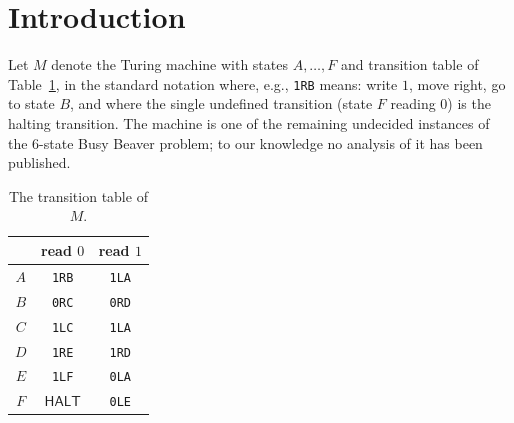 \documentclass[11pt]{amsart}
\theoremstyle{definition}
\DeclareMathOperator{\HALT}{\textsf{HALT}}
\begin{document}
\begin{abstract}
roots); a \emph{parity kill of dangerous keys} ($q\equiv1\bmod144\wedge q>1
\Rightarrow q\ge145\Rightarrow$ not a power; $19$ of the $20$ observed
classes permanently safe by key definition); and the \emph{drift law}
$\mathrm{M''}$ --- eight window families with the unified form
$A=3\cdot2^{k-1}w+2^{j}\mu$ at window positions
$13/26/50/99/110/194/219/220$, every family parity-killed, with the
$m\le40$ synthetic assertion table ($60$ segments, $0$ powers, $56/56$ exact
$F_{26}$ identities) --- which compresses the residual of Assumption~M into a
single arithmetic sentence in birth coordinates: the conditional chain of
the main theorem is thereby refined to ``never halts $\Leftarrow$
$\mathrm{M''}$ $+$ class preservation'', with the three precise gaps to an
unconditional proof (window-enumeration completeness $=$ M; conditionality of
class preservation; $m>25$ as a constructed-anchor property) stated
explicitly. Per-depth raw-reproduced witnesses (through depth $3$) show
that birth guards fail at every finite depth, stated at witnessed level. All
other components are proved
algebraically or verified exhaustively over declared finite domains;
every claim is classified in a ledger (algebraic / exhaustive /
assumption-dependent).
\end{abstract}

\section{Introduction}\label{s:intro}

Let $M$ denote the Turing machine with states $A,\dots,F$ and transition
table of Table~\ref{tab:tm}, in the standard notation where, e.g.,
\texttt{1RB} means: write $1$, move right, go to state $B$, and where the
single undefined transition (state $F$ reading $0$) is the halting
transition. The machine is one of the remaining undecided instances of the
$6$-state Busy Beaver problem; to our knowledge no analysis of it has been
published.

\begin{table}[h]
\centering
\begin{tabular}{c|cc}
 & read $0$ & read $1$\\\toprule
$A$ & \texttt{1RB} & \texttt{1LA}\\
$B$ & \texttt{0RC} & \texttt{0RD}\\
$C$ & \texttt{1LC} & \texttt{1LA}\\
$D$ & \texttt{1RE} & \texttt{1RD}\\
$E$ & \texttt{1LF} & \texttt{0LA}\\
$F$ & $\HALT$ & \texttt{0LE}\\
\end{tabular}
\caption{The transition table of $M$.}
\label{tab:tm}
\end{table}
\end{document}
